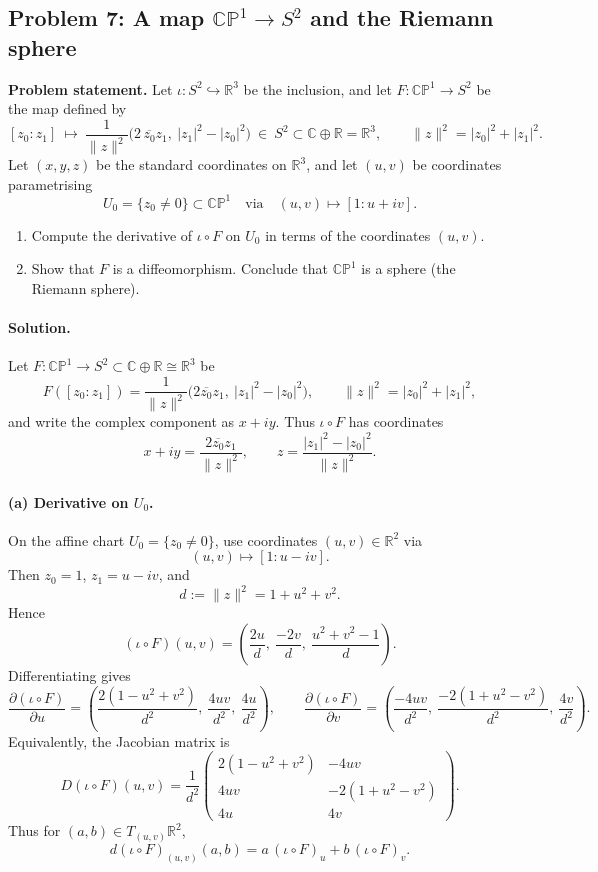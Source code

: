 \documentclass[12pt,a4paper]{article}
\theoremstyle{plain}
\theoremstyle{definition}      %
\begin{document}

\subsection*{Problem 7: A map $\mathbb{CP}^1 \to S^2$ and the Riemann sphere}

\noindent\textbf{Problem statement.}
Let $\iota:S^2\hookrightarrow \mathbb R^3$ be the inclusion, and let $F:\mathbb{CP}^1\to S^2$ be the map defined by
\[
[z_0:z_1]\ \longmapsto\ \frac{1}{\|z\|^2}\Big(2\,\overline{z_0}z_1,\ |z_1|^2-|z_0|^2\Big)
\ \in\ S^2\subset \mathbb C\oplus \mathbb R=\mathbb R^3,
\qquad \|z\|^2=|z_0|^2+|z_1|^2.
\]
Let $(x,y,z)$ be the standard coordinates on $\mathbb R^3$, and let $(u,v)$ be coordinates parametrising
\[
U_0=\{z_0\neq 0\}\subset\mathbb{CP}^1
\quad\text{via}\quad
(u,v)\longmapsto [1:u+iv].
\]
\begin{enumerate}
	\item[(a)] Compute the derivative of $\iota\circ F$ on $U_0$ in terms of the coordinates $(u,v)$.
	\item[(b)] Show that $F$ is a diffeomorphism. Conclude that $\mathbb{CP}^1$ is a sphere (the Riemann sphere).
\end{enumerate}




\paragraph{\textbf{Solution.}}
Let $F:\mathbb{CP}^1\to S^2\subset \mathbb{C}\oplus\mathbb{R}\cong\mathbb{R}^3$ be
\[
F([z_0:z_1])=\frac{1}{\|z\|^2}\bigl(2\overline{z_0}z_1,\ |z_1|^2-|z_0|^2\bigr),
\qquad \|z\|^2=|z_0|^2+|z_1|^2,
\]
and write the complex component as $x+iy$. Thus $\iota\circ F$ has coordinates
\[
x+iy=\frac{2\overline{z_0}z_1}{\|z\|^2},\qquad
z=\frac{|z_1|^2-|z_0|^2}{\|z\|^2}.
\]

\paragraph{(a) Derivative on $U_0$.}
On the affine chart $U_0=\{z_0\neq 0\}$, use coordinates $(u,v)\in\mathbb{R}^2$ via
\[
(u,v)\longmapsto [1:u-iv].
\]
Then $z_0=1$, $z_1=u-iv$, and
\[
d:=\|z\|^2=1+u^2+v^2.
\]
Hence
\[
(\iota\circ F)(u,v)=\left(
\frac{2u}{d},\ \frac{-2v}{d},\ \frac{u^2+v^2-1}{d}
\right).
\]
Differentiating gives
\[
\frac{\partial(\iota\circ F)}{\partial u}
=
\left(
\frac{2(1-u^2+v^2)}{d^2},\ \frac{4uv}{d^2},\ \frac{4u}{d^2}
\right),
\qquad
\frac{\partial(\iota\circ F)}{\partial v}
=
\left(
\frac{-4uv}{d^2},\ \frac{-2(1+u^2-v^2)}{d^2},\ \frac{4v}{d^2}
\right).
\]
Equivalently, the Jacobian matrix is
\[
D(\iota\circ F)(u,v)=\frac{1}{d^2}
\begin{pmatrix}
	2(1-u^2+v^2) & -4uv\\
	4uv & -2(1+u^2-v^2)\\
	4u & 4v
\end{pmatrix}.
\]
Thus for $(a,b)\in T_{(u,v)}\mathbb{R}^2$,
\[
d(\iota\circ F)_{(u,v)}(a,b)=a\,(\iota\circ F)_u+b\,(\iota\circ F)_v.
\]
\end{document}
